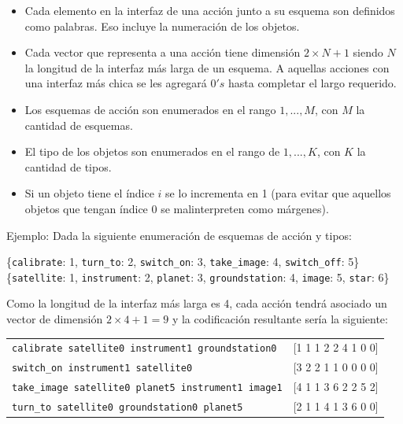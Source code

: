 \begin{itemize}
    \item Cada elemento en la interfaz de una acción junto a su esquema son
    definidos como palabras. Eso incluye la numeración de los objetos.
    \item Cada vector que representa a una acción tiene dimensión $2 \times N +
    1$ siendo $N$ la longitud de la interfaz más larga de un esquema. A aquellas
    acciones con una interfaz más chica se les agregará $0's$ hasta completar el
    largo requerido.
    \item Los esquemas de acción son enumerados en el rango $1, ..., M$, con $M$
    la cantidad de esquemas.
    \item El tipo de los objetos son enumerados en el rango de $1, ..., K$, con
    $K$ la cantidad de tipos.
    \item Si un objeto tiene el índice $i$ se lo incrementa en 1 (para evitar
    que aquellos objetos que tengan índice 0 se malinterpreten como márgenes).
\end{itemize}

Ejemplo: Dada la siguiente enumeración de esquemas de acción y tipos:

\begin{center}
    \{\verb|calibrate|: 1, \verb|turn_to|: 2, \verb|switch_on|: 3,
    \verb|take_image|: 4, \verb|switch_off|: 5\} \\
    \{\verb|satellite|: 1, \verb|instrument|: 2, \verb|planet|: 3,
    \verb|groundstation|: 4, \verb|image|: 5, \verb|star|: 6\}
\end{center}

Como la longitud de la interfaz más larga es 4, cada acción tendrá asociado un
vector de dimensión $2 \times 4 + 1 = 9$ y la codificación resultante sería la
siguiente:

\begin{table}[h!]
    \centering
    \begin{tabular}{l|c}
        \verb|calibrate satellite0 instrument1 groundstation0| & {} [1 1 1 2 2
        4 1 0 0] \\
        \verb|switch_on instrument1 satellite0| & {} [3 2 2 1 1 0 0 0 0] \\
        \verb|take_image satellite0 planet5 instrument1 image1| & {} [4 1 1 3 6
        2 2 5 2] \\
        \verb|turn_to satellite0 groundstation0 planet5| & {} [2 1 1 4 1 3 6 0
        0] \\
    \end{tabular}
\end{table}

